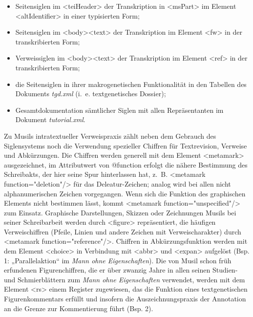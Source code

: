 \documentclass{article}
\begin{document}
        \begin{itemize}\item {Seitensiglen im <teiHeader> der
                     Transkription in <msPart> im Element <altIdentifier> in einer typisierten
                     Form;}\item {Seitensiglen im <body><text> der
                     Transkription im Element <fw> in der
                     transkribierten Form;}\item {Verweissiglen im <body><text>
                     der Transkription im Element <ref> in der
                     transkribierten Form;}\item {die Seitensiglen in ihrer makrogenetischen Funktionalität in den Tabellen
                     des Dokuments \emph{tgd.xml} (i. e. textgenetisches
                     Dossier);}\item {Gesamtdokumentation sämtlicher Siglen mit allen Repräsentanten im Dokument
                        \emph{tutorial.xml}.}\end{itemize}Zu Musils intratextueller Verweispraxis zählt neben dem Gebrauch des Siglensystems
                  noch die Verwendung spezieller Chiffren für Textrevision, Verweise und
                  Abkürzungen. Die Chiffren werden generell mit dem Element <metamark> ausgezeichnet, im Attributwert von @function erfolgt die nähere Bestimmung des Schreibakts, der hier seine
                  Spur hinterlassen hat, z. B. <metamark
                     function="deletion"/> für das Deleatur-Zeichen; analog wird bei allen
                  nicht alphanumerischen Zeichen vorgegangen. Wenn sich die Funktion des graphischen
                  Elements nicht bestimmen lässt, kommt <metamark
                     function="unspecified"/> zum Einsatz. Graphische Darstellungen,
                  Skizzen oder Zeichnungen Musils bei seiner Schreibarbeit werden durch <figure> repräsentiert, die häufigen
                  Verweischiffren (Pfeile, Linien und andere Zeichen mit Verweischarakter) durch
                     <metamark function="reference"/>. Chiffren
                  in Abkürzungsfunktion werden mit dem Element <choice> in Verbindung mit <abbr> und <expan> aufgelöst
                  (Bsp. 1: „Parallelaktion“ im \emph{Mann ohne Eigenschaften}). Die
                  von Musil schon früh erfundenen Figurenchiffren, die er über zwanzig Jahre in
                  allen seinen Studien- und Schmierblättern zum \emph{Mann ohne
                     Eigenschaften} verwendet, werden mit dem Element <rs> einem Register zugewiesen, das die Funktion eines
                  textgenetischen Figurenkommentars erfüllt und insofern die Auszeichnungspraxis der
                  Annotation an die Grenze zur Kommentierung führt (Bsp. 2). \\
            
\end{document}
